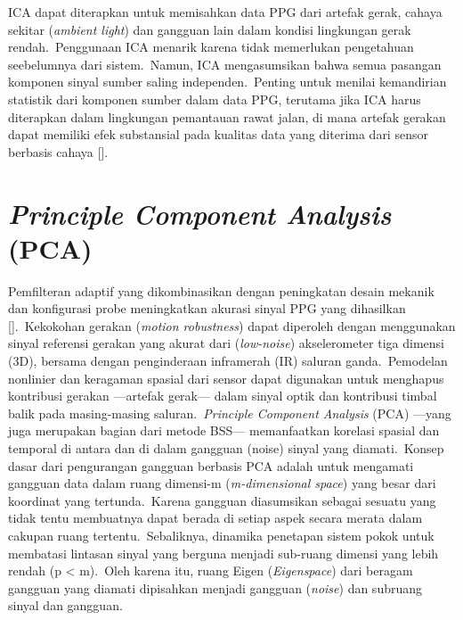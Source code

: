 ICA dapat diterapkan untuk memisahkan data PPG dari artefak gerak, cahaya sekitar (\textit{ambient light}) dan gangguan lain dalam kondisi lingkungan gerak rendah.~Penggunaan ICA menarik karena tidak memerlukan pengetahuan seebelumnya dari sistem.~Namun, ICA mengasumsikan bahwa semua pasangan komponen sinyal sumber saling independen.~Penting untuk menilai kemandirian statistik dari komponen sumber dalam data PPG, terutama jika ICA harus diterapkan dalam lingkungan pemantauan rawat jalan, di mana artefak gerakan dapat memiliki efek substansial pada kualitas data yang diterima dari sensor berbasis cahaya [\citet{Tamura2014}].

\section{\textit{Principle Component Analysis} (PCA)}
Pemfilteran adaptif yang dikombinasikan dengan peningkatan desain mekanik dan konfigurasi probe meningkatkan akurasi sinyal PPG yang dihasilkan [\citet{Rhee2001}].~Kekokohan gerakan (\textit{motion robustness}) dapat diperoleh dengan menggunakan sinyal referensi gerakan yang akurat dari (\textit{low-noise}) akselerometer tiga dimensi (3D), bersama dengan penginderaan inframerah (IR) saluran ganda.~Pemodelan nonlinier dan keragaman spasial dari sensor dapat digunakan untuk menghapus kontribusi gerakan ---artefak gerak--- dalam sinyal optik dan kontribusi timbal balik pada masing-masing saluran.~\textit{Principle Component Analysis} (PCA) ---yang juga merupakan bagian dari metode BSS--- memanfaatkan korelasi spasial dan temporal di antara dan di dalam gangguan (noise) sinyal yang diamati.~Konsep dasar dari pengurangan gangguan berbasis PCA adalah untuk mengamati gangguan data dalam ruang dimensi-m (\textit{m-dimensional space}) yang besar dari koordinat yang tertunda.~Karena gangguan diasumsikan sebagai sesuatu yang tidak tentu membuatnya dapat berada di setiap aspek secara merata dalam cakupan ruang tertentu.~Sebaliknya, dinamika penetapan sistem pokok untuk membatasi lintasan sinyal yang berguna menjadi sub-ruang dimensi yang lebih rendah (p < m).~Oleh karena itu, ruang Eigen (\textit{Eigenspace}) dari beragam gangguan yang diamati dipisahkan menjadi gangguan (\textit{noise}) dan subruang sinyal dan gangguan.

